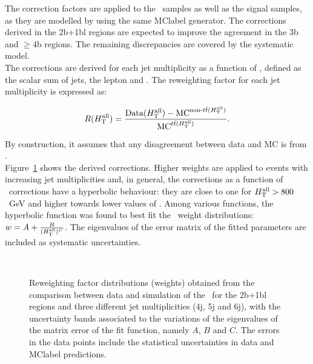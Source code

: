 The correction factors are applied to the \ttbar\ samples as well as the signal samples, as they are modelled by using the same \acrshort{MClabel} generator. The corrections derived in the 2b+1bl regions are expected to improve the agreement in the 3b and $\geq$4b regions. The remaining discrepancies are covered by the systematic model.\\

The corrections are derived for each jet multiplicity as a function of \HTall, defined as the scalar \pT sum of jets, the lepton and \MET. The reweighting factor for each jet multiplicity is expressed as:

\begin{equation}
    \label{tqX:RWeq}
    R(H_{\text{T}}^{\text{all}})=\frac{ \text{Data}(H_{\text{T}}^{\text{all}}) - \text{MC}^{\text{non-\ensuremath{t\bar{t}}}(H_{\text{T}}^{\text{all}})} }{\text{MC}^{\text{\ensuremath{t\bar{t}}}(H_{\text{T}}^{\text{all}})}}.
\end{equation}

By construction, it assumes that any disagreement between data and MC is from \ttbar.\\

Figure~\ref{tqX:RWfactors} shows the derived corrections. Higher weights are applied to events with increasing jet multiplicities and, in general, the corrections as a function of \HTall\ corrections have a hyperbolic behaviour: they are close to one for $H_{\text{T}}^{\text{all}} > 800$~GeV and higher towards lower values of \HTall. Among various functions, the hyperbolic function was found to best fit the \HTall\ weight distributions: $w=A+\frac{B}{(H_{\text{T}}^{\text{all}})^C}$. The eigenvalues of the error matrix of the fitted parameters are included as systematic uncertainties.\\

\begin{figure}[htb]
    \RawFloats
    \begin{center}
     \\
    \caption{Reweighting factor distributions (weights) obtained from the comparison between data and simulation of the \HTall\ for the 2b+1bl regions and three different jet multiplicities (4j, 5j and 6j), with the uncertainty bands associated to the variations of the eigenvalues of the matrix error of the fit function, namely $A$, $B$ and $C$. The errors in the data points include the statistical uncertainties in data and \acrshort{MClabel} predictions.}
    \label{tqX:RWfactors}
\end{center}
\end{figure}

